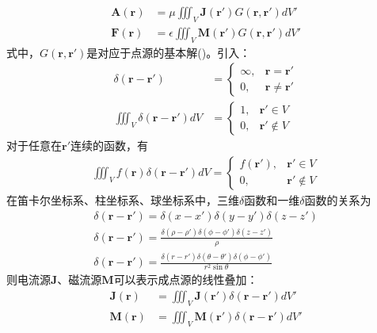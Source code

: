 \documentclass{article}
\numberwithin{equation}{section}
\renewcommand{\vec}[1]{\boldsymbol{#1}}
\begin{document}
\begin{align}
    \label{eq:eq84}
    \mathbf{A}(\vec{r})&=\mu\iiint_V\mathbf{J}(\vec{r}')G(\vec{r},\vec{r}')dV' \\
    \label{eq:eq97}
    \mathbf{F}(\vec{r})&=\epsilon\iiint_V\mathbf{M}(\vec{r}')G(\vec{r},\vec{r}')dV'
\end{align}
式中，$G(\vec{r},\vec{r}')$是对应于点源的基本解(\textbf{\color{blue}{格林函数}})。引入\textbf{\color{blue}{$\delta$函数}}：
\begin{align}
    \label{eq:eq85}
    \delta(\vec{r}-\vec{r}')&=
    \left\{
        \begin{array}{lr}
            \infty, &\vec{r}=\vec{r}' \\
            0,      &\vec{r}\neq\vec{r}'
        \end{array}
    \right. \\
    \label{eq:eq86}
    \iiint_V\delta(\vec{r}-\vec{r}')dV&=
    \left\{
        \begin{array}{lr}
            1, &\vec{r}'\in V \\
            0, &\vec{r}'\notin V
        \end{array}
    \right.
\end{align}
对于任意在$\vec{r}'$连续的函数，有
\begin{align}
    \label{eq:eq87}
    \iiint_Vf(\vec{r})\delta(\vec{r}-\vec{r}')dV=
    \left\{
        \begin{array}{lr}
            f(\vec{r}'), &\vec{r}'\in V \\
            0, &\vec{r}'\notin V
        \end{array}
    \right.
\end{align}
在笛卡尔坐标系、柱坐标系、球坐标系中，三维$\delta$函数和一维$\delta$函数的关系为
\begin{align}
    \delta(\vec{r}-\vec{r}')=\delta(x-x')\delta(y-y')\delta(z-z') \\
    \delta(\vec{r}-\vec{r}')=\frac{\delta(\rho-\rho')\delta(\phi-\phi')\delta(z-z')}{\rho} \\
    \delta(\vec{r}-\vec{r}')=\frac{\delta(r-r')\delta(\theta-\theta')\delta(\phi-\phi')}{r^2\sin\theta}
\end{align}
则电流源$\mathbf{J}$、磁流源$\mathbf{M}$可以表示成点源的线性叠加：
\begin{align}
    \label{eq:eq88}
    \mathbf{J}(\vec{r})&=\iiint_V\mathbf{J}(\vec{r}')\delta(\vec{r}-\vec{r}')dV' \\
    \label{eq:eq98}
    \mathbf{M}(\vec{r})&=\iiint_V\mathbf{M}(\vec{r}')\delta(\vec{r}-\vec{r}')dV'
\end{align}
\end{document}
